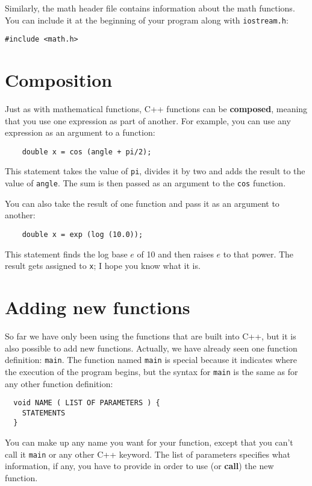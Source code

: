 Similarly, the math header file contains information
about the math functions.  You can include it at the beginning
of your program along with {\tt iostream.h}:

\begin{verbatim}
#include <math.h>
\end{verbatim}

\section {Composition}
\label{composition}

Just as with mathematical functions, C++ functions can be {\bf
composed}, meaning that you use one expression as part of another.
For example, you can use any expression as an argument to a function:

\begin{verbatim}
    double x = cos (angle + pi/2);
\end{verbatim}
%
This statement takes the value of {\tt pi}, divides it by two and
adds the result to the value of {\tt angle}.  The sum is
then passed as an argument to the {\tt cos} function.

You can also take the result of one function and pass it as
an argument to another:

\begin{verbatim}
    double x = exp (log (10.0));
\end{verbatim}
%
This
statement finds the log base $e$ of 10 and then raises $e$ to that
power.  The result gets assigned to {\tt x}; I hope you know what it
is.

\section{Adding new functions}

So far we have only been using the functions that are built into C++,
but it is also possible to add new functions.  Actually, we have already
seen one function definition: {\tt main}.  The function named {\tt main}
is special because it indicates where the execution of the program
begins, but the syntax for {\tt main} is the same as for any other
function definition:

\begin{verbatim}
  void NAME ( LIST OF PARAMETERS ) {
    STATEMENTS
  }
\end{verbatim}
%
You can make up any name you want for your function, except
that you can't call it {\tt main} or any other
C++ keyword.  The list of
parameters specifies what information, if any, you have to
provide in order to use (or {\bf call}) the new function.

